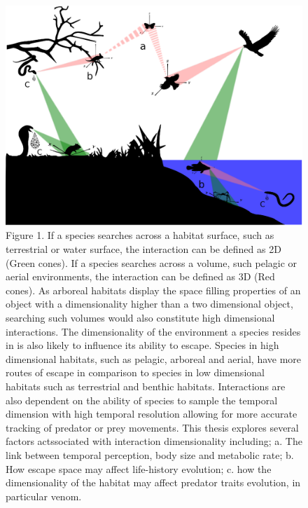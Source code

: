 \begin{figure}[!htp]
  \centering
  \includegraphics[keepaspectratio=true, width=1.0\textwidth,left]{ch1-introduction/fig_into.eps}\hspace*{10cm}
  \caption[ ]{Figure 1. If a species searches across a habitat surface, such as terrestrial or water surface, the interaction can be defined as 2D (Green cones). If a species searches across a volume, such pelagic or aerial environments, the interaction can be defined as 3D (Red cones). As arboreal habitats display the space filling properties of an object with a dimensionality higher than a two dimensional object, searching such volumes would also constitute high dimensional interactions. The dimensionality of the environment a species resides in is also likely to influence its ability to escape. Species in high dimensional habitats, such as pelagic, arboreal and aerial, have more routes of escape in comparison to species in low dimensional habitats such as terrestrial and benthic habitats. Interactions are also dependent on the ability of species to sample the temporal dimension with high temporal resolution allowing for more accurate tracking of predator or prey movements. This thesis explores several factors actssociated with interaction dimensionality including; a. The link between temporal perception, body size and metabolic rate; b. How escape space may affect life-history evolution; c. how the dimensionality of the habitat may affect predator traits evolution, in particular venom.}
  \label{fig:Figure 2.}
\end{figure}



